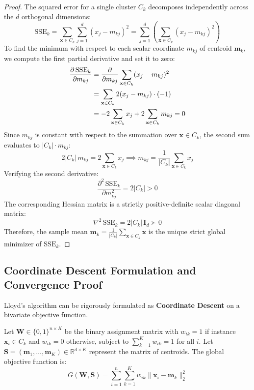 \begin{proof}
The squared error for a single cluster $C_k$ decomposes independently across the $d$ orthogonal dimensions:
\begin{equation}
    \mathrm{SSE}_k = \sum_{\mathbf{x} \in C_k} \sum_{j=1}^d (x_j - m_{kj})^2 = \sum_{j=1}^d \left( \sum_{\mathbf{x} \in C_k} (x_j - m_{kj})^2 \right)
\end{equation}
To find the minimum with respect to each scalar coordinate $m_{kj}$ of centroid $\mathbf{m}_k$, we compute the first partial derivative and set it to zero:
\begin{align}
    \frac{\partial \, \mathrm{SSE}_k}{\partial m_{kj}} &= \frac{\partial}{\partial m_{kj}} \sum_{\mathbf{x} \in C_k} (x_j - m_{kj})^2 \notag \\
    &= \sum_{\mathbf{x} \in C_k} 2 (x_j - m_{kj}) \cdot (-1) \notag \\
    &= -2 \sum_{\mathbf{x} \in C_k} x_j + 2 \sum_{\mathbf{x} \in C_k} m_{kj} = 0
\end{align}
Since $m_{kj}$ is constant with respect to the summation over $\mathbf{x} \in C_k$, the second sum evaluates to $|C_k| \cdot m_{kj}$:
\begin{equation}
    2 |C_k| \, m_{kj} = 2 \sum_{\mathbf{x} \in C_k} x_j \implies m_{kj} = \frac{1}{|C_k|} \sum_{\mathbf{x} \in C_k} x_j
\end{equation}
Verifying the second derivative:
\begin{equation}
    \frac{\partial^2 \, \mathrm{SSE}_k}{\partial m_{kj}^2} = 2 |C_k| > 0
\end{equation}
The corresponding Hessian matrix is a strictly positive-definite scalar diagonal matrix:
\begin{equation}
    \nabla^2 \, \mathrm{SSE}_k = 2 |C_k| \, \mathbf{I}_d \succ 0
\end{equation}
Therefore, the sample mean $\mathbf{m}_k = \frac{1}{|C_k|} \sum_{\mathbf{x} \in C_k} \mathbf{x}$ is the unique strict global minimizer of $\mathrm{SSE}_k$.
\end{proof}

\subsection{Coordinate Descent Formulation and Convergence Proof}

Lloyd's algorithm can be rigorously formulated as \textbf{Coordinate Descent} on a bivariate objective function.

Let $\mathbf{W} \in \{0, 1\}^{n \times K}$ be the binary assignment matrix with $w_{ik} = 1$ if instance $\mathbf{x}_i \in C_k$ and $w_{ik} = 0$ otherwise, subject to $\sum_{k=1}^K w_{ik} = 1$ for all $i$. Let $\mathbf{S} = (\mathbf{m}_1, \dots, \mathbf{m}_K) \in \mathbb{R}^{d \times K}$ represent the matrix of centroids. The global objective function is:
\begin{equation}
    G(\mathbf{W}, \mathbf{S}) = \sum_{i=1}^n \sum_{k=1}^K w_{ik} \|\mathbf{x}_i - \mathbf{m}_k\|_2^2
    \label{eq:dm-kmeans-coordinate-descent-obj-en}
\end{equation}

